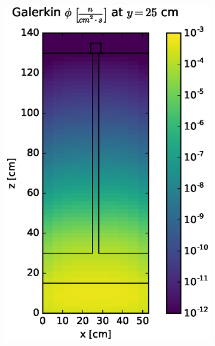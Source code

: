 \documentclass{article} %
\begin{document}
\begin{figure}[!htb]
\begin{subfigure}{0.4\textwidth}
\includegraphics[max height=0.445\textheight]
{img/steel-fwd-flux-gkn04.eps}
\end{subfigure}
\\
\begin{subfigure}{0.4\textwidth}

\end{subfigure}
\end{figure}
\end{document}
